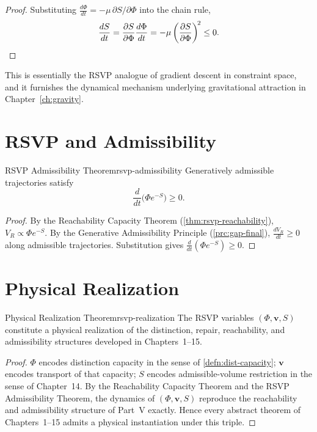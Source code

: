 \documentclass[12pt,twoside,openright]{book}
\begin{document}
\begin{proof}
  Substituting $\frac{d\Phi}{dt} = -\mu\,\partial S/\partial\Phi$
  into the chain rule,
  \[
    \frac{dS}{dt}
    = \frac{\partial S}{\partial \Phi}\frac{d\Phi}{dt}
    = -\mu \left(\frac{\partial S}{\partial \Phi}\right)^{\!2}
    \le 0. \qedhere
  \]
\end{proof}

This is essentially the RSVP analogue of gradient descent
in constraint space, and it furnishes the dynamical
mechanism underlying gravitational attraction in
Chapter~\ref{ch:gravity}.

\section{RSVP and Admissibility}
\label{sec:ch16-admissibility}

\begin{theorem}{RSVP Admissibility Theorem}{rsvp-admissibility}
  Generatively admissible trajectories satisfy
  \[
    \frac{d}{dt}\bigl(\Phi e^{-S}\bigr) \ge 0.
  \]
\end{theorem}

\begin{proof}
  By the Reachability Capacity Theorem
  (\cref{thm:rsvp-reachability}), $V_R \propto \Phi e^{-S}$.
  By the Generative Admissibility Principle
  (\cref{prc:gap-final}), $\frac{dV_R}{dt} \ge 0$ along
  admissible trajectories. Substitution gives
  $\frac{d}{dt}(\Phi e^{-S}) \ge 0$.
\end{proof}

\section{Physical Realization}
\label{sec:ch16-realization}

\begin{theorem}{Physical Realization Theorem}{rsvp-realization}
  The RSVP variables $(\Phi, \mathbf{v}, S)$ constitute a
  physical realization of the distinction, repair,
  reachability, and admissibility structures developed in
  Chapters~1--15.
\end{theorem}

\begin{proof}
  $\Phi$ encodes distinction capacity in the sense of
  \cref{defn:dist-capacity}; $\mathbf{v}$ encodes transport
  of that capacity; $S$ encodes admissible-volume
  restriction in the sense of Chapter~14. By the
  Reachability Capacity Theorem and the RSVP Admissibility
  Theorem, the dynamics of $(\Phi,\mathbf{v},S)$ reproduce
  the reachability and admissibility structure of
  Part~V exactly. Hence every abstract theorem of
  Chapters~1--15 admits a physical instantiation under this
  triple.
\end{proof}
\end{document}
